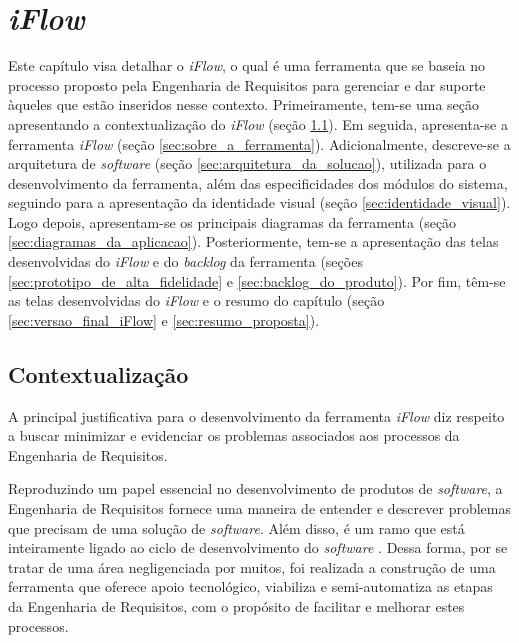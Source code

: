 \chapter[\textit{iFlow}]{\textit{iFlow}}

\label{chap:proposta}

Este capítulo visa detalhar o \textit{iFlow}, o qual é uma ferramenta que se baseia no processo proposto pela Engenharia de Requisitos para gerenciar e dar suporte àqueles que estão inseridos nesse contexto. Primeiramente, tem-se uma seção apresentando a contextualização do \textit{iFlow} (seção \ref{sec:contextualizacao}). Em seguida, apresenta-se a ferramenta \textit{iFlow} (seção \ref{sec:sobre_a_ferramenta}). Adicionalmente, descreve-se a arquitetura de \textit{software} (seção \ref{sec:arquitetura_da_solucao}), utilizada para o desenvolvimento da ferramenta, além das especificidades dos módulos do sistema, seguindo para a apresentação da identidade visual (seção \ref{sec:identidade_visual}). Logo depois, apresentam-se os principais diagramas da ferramenta (seção \ref{sec:diagramas_da_aplicacao}). Posteriormente, tem-se a apresentação das telas desenvolvidas do \textit{iFlow} e do \textit{backlog} da ferramenta (seções \ref{sec:prototipo_de_alta_fidelidade} e \ref{sec:backlog_do_produto}). Por fim, têm-se as telas desenvolvidas do \textit{iFlow} e o resumo do capítulo (seção \ref{sec:versao_final_iFlow} e \ref{sec:resumo_proposta}).

\section{Contextualização}

\label{sec:contextualizacao}

A principal justificativa para o desenvolvimento da ferramenta \textit{iFlow} diz respeito a buscar minimizar e evidenciar os problemas associados aos processos da Engenharia de Requisitos.

Reproduzindo um papel essencial no desenvolvimento de produtos de \textit{software}, a Engenharia de Requisitos fornece uma maneira de entender e descrever problemas que precisam de uma solução de \textit{software}. Além disso, é um ramo que está inteiramente ligado ao ciclo de desenvolvimento do \textit{software} \cite{elliott2012software}. Dessa forma, por se tratar de uma área negligenciada por muitos, foi realizada a construção de uma ferramenta que oferece apoio tecnológico, viabiliza e semi-automatiza as etapas da Engenharia de Requisitos, com o propósito de facilitar e melhorar estes processos.

